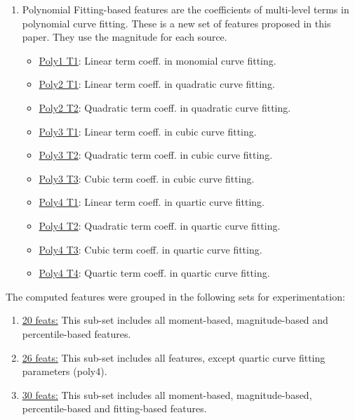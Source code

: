 \begin{enumerate}
    \item Polynomial Fitting-based features are the coefficients of multi-level terms in polynomial curve fitting. These is a new set of features proposed in this paper. They use the magnitude for each source.
    \begin{itemize}
        \item \underline{Poly1 T1}: Linear term coeff. in monomial curve fitting.
        \item \underline{Poly2 T1}: Linear term coeff. in quadratic curve fitting.
        \item \underline{Poly2 T2}: Quadratic term coeff. in quadratic curve fitting.
        \item \underline{Poly3 T1}: Linear term coeff. in cubic curve fitting.
        \item \underline{Poly3 T2}: Quadratic term coeff. in cubic curve fitting.
        \item \underline{Poly3 T3}: Cubic term coeff. in cubic curve fitting.
        \item \underline{Poly4 T1}: Linear term coeff. in quartic curve fitting.
        \item \underline{Poly4 T2}: Quadratic term coeff. in quartic curve fitting.
        \item \underline{Poly4 T3}: Cubic term coeff. in quartic curve fitting.
        \item \underline{Poly4 T4}: Quartic term coeff. in quartic curve fitting.
    \end{itemize}

\end{enumerate}

The computed features were grouped in the following sets for experimentation:

\begin{enumerate}
    \item \underline{20 feats:} This sub-set includes all moment-based, magnitude-based and percentile-based features.
    \item \underline{26 feats:} This sub-set includes all features, except quartic curve fitting parameters (poly4).
    \item \underline{30 feats:} This sub-set includes all moment-based, magnitude-based, percentile-based and fitting-based features.
\end{enumerate}



